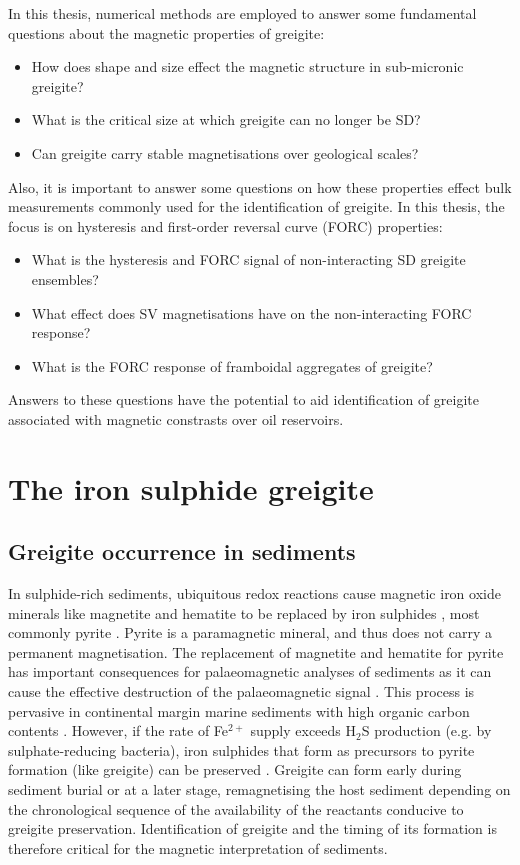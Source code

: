 In this thesis, numerical methods are employed to answer some fundamental questions about the magnetic properties of greigite:
\begin{itemize}
\item How does shape and size effect the magnetic structure in sub-micronic greigite?
\item What is the critical size at which greigite can no longer be SD?
\item Can greigite carry stable magnetisations over geological scales?
\end{itemize}
Also, it is important to answer some questions on how these properties effect bulk measurements commonly used for the identification of greigite. In this thesis, the focus is on hysteresis \citep{Mayergoyz1986} and first-order reversal curve (FORC) \citep{Roberts2000} properties:
\begin{itemize}
\item What is the hysteresis and FORC signal of non-interacting SD greigite ensembles?
\item What effect does SV magnetisations have on the non-interacting FORC response?
\item What is the FORC response of framboidal aggregates of greigite?
\end{itemize}
Answers to these questions have the potential to aid identification of greigite associated with magnetic constrasts over oil reservoirs.\par

\section{The iron sulphide greigite}
\subsection{Greigite occurrence in sediments}
In sulphide-rich sediments, ubiquitous redox reactions cause magnetic iron oxide minerals like magnetite and hematite to be replaced by iron sulphides \citep{Roberts2015}, most commonly pyrite \citep{Berner1984}. Pyrite is a paramagnetic mineral, and thus does not carry a permanent magnetisation. The replacement of magnetite and hematite for pyrite has important consequences for palaeomagnetic analyses of sediments as it can cause the effective destruction of the palaeomagnetic signal \citep{Rowan2009}. This process is pervasive in continental margin marine sediments with high organic carbon contents \citep{Roberts2015}. However, if the rate of Fe$^{2{+}}$ supply exceeds H$_2$S production (e.g. by sulphate-reducing bacteria), iron sulphides that form as precursors to pyrite formation (like greigite) can be preserved \citep{Berner1984}. Greigite can form early during sediment burial \citep{Reynolds1999} or at a later stage, remagnetising the host sediment \citep{Roberts2005} depending on the chronological sequence of the availability of the reactants conducive to greigite preservation. Identification of greigite and the timing of its formation is therefore critical for the magnetic interpretation of sediments.\par

